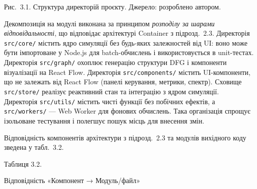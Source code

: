 Рис.~3.1. Структура директорій проєкту. Джерело: розроблено автором.

Декомпозиція на модулі виконана за принципом \emph{розподілу за шарами
відповідальності}, що відповідає архітектурі Container з підрозд.~2.3.
Директорія \texttt{src/core/} містить ядро симуляції без будь-яких
залежностей від UI: воно може бути імпортоване у Node.js для
batch-обчислень і використовується в unit-тестах. Директорія
\texttt{src/graph/} охоплює генерацію структури DFG і компоненти
візуалізації на React Flow. Директорія \texttt{src/components/} містить
UI-компоненти, що не залежать від React Flow (панелі керування, метрики,
спектр). Сховище \texttt{src/store/} реалізує реактивний стан та
інтеграцію з ядром симуляції. Директорія \texttt{src/utils/} містить чисті
функції без побічних ефектів, а \texttt{src/workers/} --- Web Worker для
фонових обчислень. Така організація спрощує ізольоване тестування і
полегшує пошук місць для внесення змін.

Відповідність компонентів архітектури з підрозд.~2.3 та модулів
вихідного коду зведена у табл.~3.2.

Таблиця 3.2.

Відповідність «Компонент → Модуль/файл»

